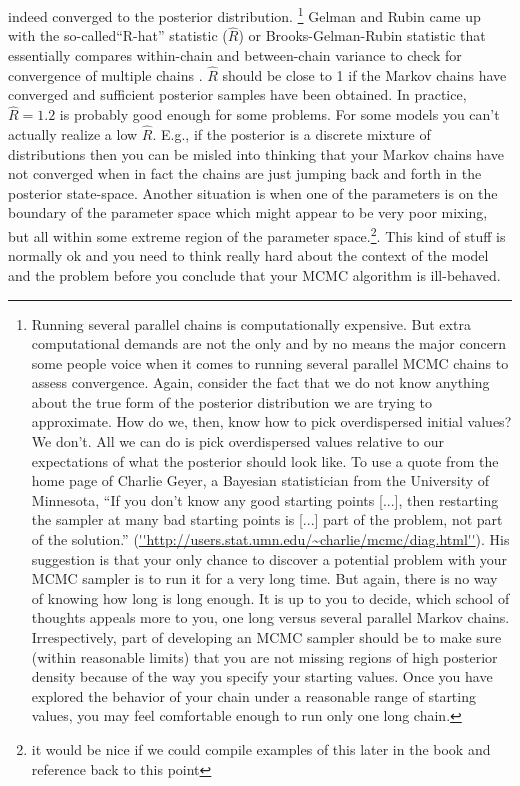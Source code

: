 indeed converged to the posterior distribution. \footnote{Running
  several parallel chains is computationally expensive. But extra
  computational demands are not the only and by no means the major
  concern some people voice when it comes to running several parallel
  MCMC chains to assess convergence. Again, consider the fact that we
  do not know anything about the true form of the posterior
  distribution we are trying to approximate. How do we, then, know how
  to pick overdispersed initial values? We don't. All we can do is
  pick overdispersed values relative to our expectations of what the
  posterior should look like. To use a quote from the home page of
  Charlie Geyer, a Bayesian statistician from the University of
  Minnesota, ``If you don't know any good starting points [...], then
  restarting the sampler at many bad starting points is [...] part of
  the problem, not part of the solution.''
  (\url{''http://users.stat.umn.edu/~charlie/mcmc/diag.html''}). His suggestion
  is that your only chance to discover a potential problem with your
  MCMC sampler is to run it for a very long time. But again, there is
  no way of knowing how long is long enough.  It is up to you to
  decide, which school of thoughts appeals more to you, one long
  versus several parallel Markov chains. Irrespectively, part of
  developing an MCMC sampler should be to make sure (within reasonable
  limits) that you are not missing regions of high posterior density
  because of the way you specify your starting values. Once you have
  explored the behavior of your chain under a reasonable range of
  starting values, you may feel comfortable enough to run only one
  long chain.} Gelman and Rubin came up with the so-called``R-hat''
statistic ($\hat{R}$) or Brooks-Gelman-Rubin statistic that
essentially compares within-chain and between-chain variance to check
for convergence of multiple chains \citep{gelman_etal:1996}. $\hat{R}$
should be close to 1 if the Markov chains have converged and
sufficient posterior samples have been obtained. In practice, $\hat{R}
= 1.2$ is probably good enough for some problems.  For some models you
can't actually realize a low $\hat{R}$. E.g., if the posterior is a
discrete mixture of distributions then you can be misled into thinking
that your Markov chains have not converged when in fact the chains are
just jumping back and forth in the posterior state-space.
Another situation is when one of the parameters is on the boundary of
the parameter space which might appear to be very poor mixing, but all
within some extreme region of the parameter space.\footnote{it would
  be nice if we could compile examples of this later in the book and
  reference back to this point}.
This
kind of stuff is normally ok and you need to think really hard about
the context of the model and the problem before you conclude that your
MCMC algorithm is ill-behaved.

